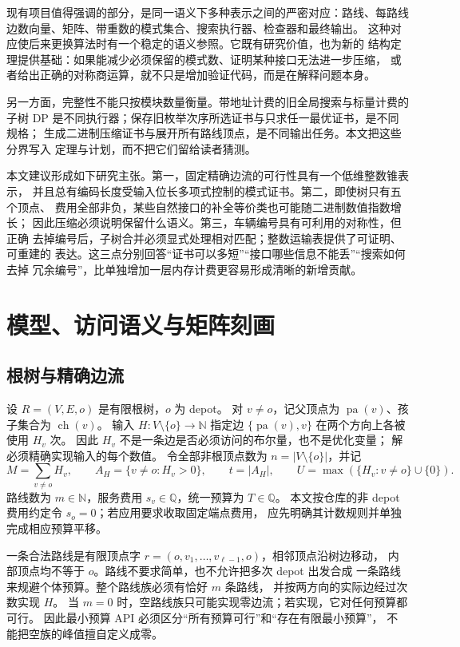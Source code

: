\documentclass[UTF8,a4paper,11pt,fontset=fandol]{ctexart}
\theoremstyle{definition}
\newcommand{\N}{\mathbb N}
\newcommand{\Q}{\mathbb Q}
\newcommand{\parv}{\operatorname{pa}}
\newcommand{\ch}{\operatorname{ch}}
\begin{document}
现有项目值得强调的部分，是同一语义下多种表示之间的严密对应：路线、每路线
边数向量、矩阵、带重数的模式集合、搜索执行器、检查器和最终输出。
这种对应使后来更换算法时有一个稳定的语义参照。它既有研究价值，也为新的
结构定理提供基础：如果能减少必须保留的模式数、证明某种接口无法进一步压缩，
或者给出正确的对称商运算，就不只是增加验证代码，而是在解释问题本身。

另一方面，完整性不能只按模块数量衡量。带地址计费的旧全局搜索与标量计费的
子树 DP 是不同执行器；保存旧枚举次序所选证书与只求任一最优证书，是不同规格；
生成二进制压缩证书与展开所有路线顶点，是不同输出任务。本文把这些分界写入
定理与计划，而不把它们留给读者猜测。

本文建议形成如下研究主张。第一，固定精确边流的可行性具有一个低维整数锥表示，
并且总有编码长度受输入位长多项式控制的模式证书。第二，即使树只有五个顶点、
费用全部非负，某些自然接口的补全等价类也可能随二进制数值指数增长；
因此压缩必须说明保留什么语义。第三，车辆编号具有可利用的对称性，但正确
去掉编号后，子树合并必须显式处理相对匹配；整数运输表提供了可证明、可重建的
表达。这三点分别回答“证书可以多短”“接口哪些信息不能丢”“搜索如何去掉
冗余编号”，比单独增加一层内存计费更容易形成清晰的新增贡献。

\section{模型、访问语义与矩阵刻画}\label{sec:model}

\subsection{根树与精确边流}

设 $R=(V,E,o)$ 是有限根树，$o$ 为 depot。
对 $v\neq o$，记父顶点为 $\parv(v)$、孩子集合为 $\ch(v)$。
输入 $H:V\setminus\{o\}\to\N$ 指定边
$\{\parv(v),v\}$ 在两个方向上各被使用 $H_v$ 次。
因此 $H_v$ 不是一条边是否必须访问的布尔量，也不是优化变量；
解必须精确实现输入的每个数值。
令全部非根顶点数为 $n=|V\setminus\{o\}|$，并记
\[
M=\sum_{v\neq o}H_v,\qquad
A_H=\{v\neq o:H_v>0\},\qquad t=|A_H|,\qquad
U=\max(\{H_v:v\neq o\}\cup\{0\}).
\]
路线数为 $m\in\N$，服务费用 $s_v\in\Q$，统一预算为 $T\in\Q$。
本文按仓库的非 depot 费用约定令 $s_o=0$；若应用要求收取固定端点费用，
应先明确其计数规则并单独完成相应预算平移。

一条合法路线是有限顶点字
$r=(o,v_1,\ldots,v_{\ell-1},o)$，相邻顶点沿树边移动，
内部顶点均不等于 $o$。路线不要求简单，也不允许把多次 depot 出发合成
一条路线来规避个体预算。整个路线族必须有恰好 $m$ 条路线，
并按两方向的实际边经过次数实现 $H$。
当 $m=0$ 时，空路线族只可能实现零边流；若实现，它对任何预算都可行。
因此最小预算 API 必须区分“所有预算可行”和“存在有限最小预算”，
不能把空族的峰值擅自定义成零。
\end{document}

